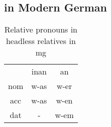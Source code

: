 \subsection{ in Modern German}

\begin{table}[h]
	\center
	\caption {Relative pronouns in headless relatives in \ac{mg}}
		\begin{tabular}{ccc}
		\toprule
							& \ac{inan}	& \ac{an}	\\
								\cmidrule{2-3}
    \ac{nom} 	& w-as    	& w-er   	\\
    \ac{acc} 	& w-as    	& w-en  	\\
    \ac{dat} 	& -  				& w-em   	\\
		\bottomrule
		\end{tabular}
\end{table}
